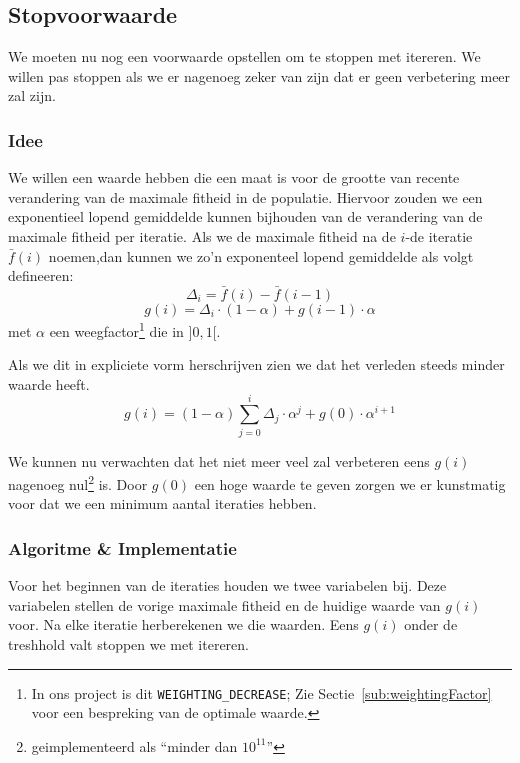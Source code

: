 %
\subsection{Stopvoorwaarde}
We moeten nu nog een voorwaarde opstellen om te stoppen met itereren. We willen pas stoppen als we er nagenoeg zeker van zijn dat er geen verbetering meer zal zijn.
\subsubsection{Idee}
We willen een waarde hebben die een maat is voor de grootte van recente verandering van de maximale fitheid in de populatie. Hiervoor zouden we een exponentieel lopend gemiddelde kunnen bijhouden van de verandering van de maximale fitheid per iteratie. Als we de maximale fitheid na de $i$-de iteratie $\bar f(i)$ noemen,dan kunnen we zo'n exponenteel lopend gemiddelde als volgt defineeren:
\[\Delta_i = \bar f(i) - \bar f(i-1)\]
\[g(i) =  \Delta_i \cdot (1-\alpha) + g(i-1)\cdot \alpha\]
met $\alpha$ een weegfactor\footnote{In ons project is dit \texttt{WEIGHTING\_DECREASE}; Zie Sectie~\ref{sub:weightingFactor} voor een bespreking van de optimale waarde.} die in $\rbrack 0,1 \lbrack$.

Als we dit in expliciete vorm herschrijven zien we dat het verleden steeds minder waarde heeft.
\[g(i) = (1-\alpha) \sum^i_{j=0} \Delta_j \cdot \alpha^j + g(0)\cdot \alpha^{i+1}\]

We kunnen nu verwachten dat het niet meer veel zal verbeteren eens $g(i)$ nagenoeg nul\footnote{geimplementeerd als ``minder dan $10^{11}$''} is. Door $g(0)$ een hoge waarde te geven zorgen we er kunstmatig voor dat we een minimum aantal iteraties hebben. 
 
\subsubsection{Algoritme \& Implementatie}
Voor het beginnen van de iteraties houden we twee variabelen bij. Deze variabelen stellen de vorige maximale fitheid en de huidige waarde van $g(i)$ voor. Na elke iteratie herberekenen we die waarden. Eens $g(i)$ onder de treshhold valt stoppen we met itereren. 
 
%